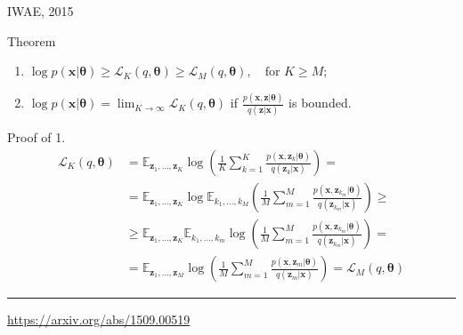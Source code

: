 \documentclass{beamer}
\newcommand{\bx}{\mathbf{x}}
\newcommand{\bz}{\mathbf{z}}
\newcommand{\btheta}{\boldsymbol{\theta}}
\begin{document}
\begin{frame}{IWAE, 2015}
\begin{block}{Theorem}
	\begin{enumerate}
		\item $\log p(\bx | \btheta) \geq \mathcal{L}_K (q, \btheta) \geq \mathcal{L}_M (q, \btheta), \quad \text{for } K \geq M$;
		\item $\log p(\bx | \btheta) = \lim_{K \rightarrow \infty} \mathcal{L}_K (q, \btheta)$ if $\frac{p(\bx, \bz | \btheta)}{q(\bz | \bx)}$ is bounded.
	\end{enumerate}
	\vspace{-0.2cm}
\end{block}
\begin{block}{Proof of 1.}
	{ \footnotesize
		\vspace{-0.5cm}
		\begin{align*}
			\mathcal{L}_K (q, \btheta) &= \mathbb{E}_{\bz_1, \dots, \bz_K} \log \left( \frac{1}{K}\sum_{k=1}^K\frac{p(\bx, \bz_k | \btheta)}{q(\bz_k| \bx)} \right) = \\
			&= \mathbb{E}_{\bz_1, \dots, \bz_K} \log \mathbb{E}_{k_1, \dots, k_M} \left( \frac{1}{M}\sum_{m=1}^M\frac{p(\bx, \bz_{k_m} | \btheta)}{q(\bz_{k_m}| \bx)} \right) \geq \\
			&\geq \mathbb{E}_{\bz_1, \dots, \bz_K} \mathbb{E}_{k_1, \dots, k_m} \log \left( \frac{1}{M}\sum_{m=1}^M\frac{p(\bx, \bz_{k_m} | \btheta)}{q(\bz_{k_m}| \bx)} \right) = \\
			&= \mathbb{E}_{\bz_1, \dots, \bz_M} \log \left( \frac{1}{M}\sum_{m=1}^M\frac{p(\bx, \bz_m | \btheta)}{q(\bz_m| \bx)} \right) = \mathcal{L}_M (q, \btheta)
		\end{align*}
	}
\end{block}

\vfill
\hrule\medskip
{\scriptsize \href{https://arxiv.org/abs/1509.00519}{https://arxiv.org/abs/1509.00519}}
\end{frame}
\end{document}
